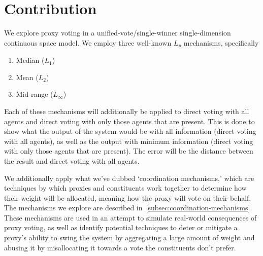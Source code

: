 \section{Contribution}\label{sec:contribution}
We explore proxy voting in a unified-vote/single-winner single-dimension
continuous space model.
We employ three well-known $L_p$ mechanisms, specifically
\begin{enumerate}
    \item {
        Median ($L_1$)
    }
    \item {
        Mean ($L_2$)
    }
    \item {
        Mid-range ($L_\infty$)
    }
\end{enumerate}
Each of these mechanisms will additionally be applied to direct voting with all
agents and direct voting with only those agents that are present.
This is done to show what the output of the system would be with all information
(direct voting with all agents), as well as the output with minimum information
(direct voting with only those agents that are present).
The error will be the distance between the result and direct voting with all agents.

We additionally apply what we've dubbed `coordination mechanisms,' which are
techniques by which proxies and constituents work together to determine how their
weight will be allocated, meaning how the proxy will vote on their behalf.
The mechanisms we explore are described
in~\autoref{subsec:coordination-mechanisms}.
These mechanisms are used in an attempt to simulate real-world consequences of proxy
voting, as well as identify potential techniques to deter or mitigate a proxy's
ability to swing the system by aggregating a large amount of weight and abusing it by
misallocating it towards a vote the constituents don't prefer.
%

